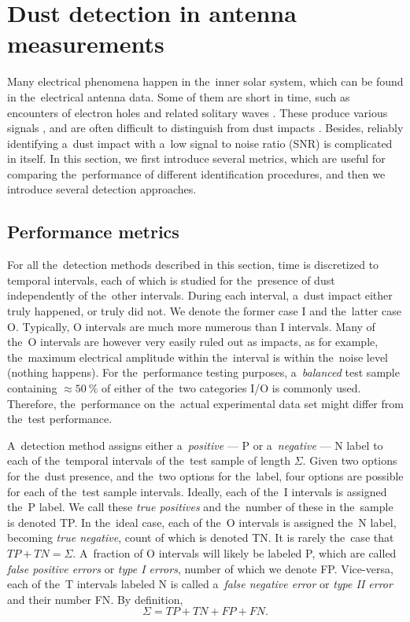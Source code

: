 \section{Dust detection in antenna measurements}

Many electrical phenomena happen in the~inner solar system, which can be found in the~electrical antenna data. Some of them are short in time, such as encounters of electron holes and related solitary waves \citep{malaspina2013electrostatic,steinvall2019multispacecraft}. These produce various signals \citep{pickett2004solitary}, and are often difficult to distinguish from dust impacts \citep{malaspina2016database,vaverka2018comparison}. Besides, reliably identifying a~dust impact with a~low signal to noise ratio ({SNR}) is complicated in itself. In this section, we first introduce several metrics, which are useful for comparing the~performance of different identification procedures, and then we introduce several detection approaches.

\subsection{Performance metrics}

For all the~detection methods described in this section, time is discretized to temporal intervals, each of which is studied for the~presence of dust independently of the~other intervals. During each interval, a~dust impact either truly happened, or truly did not. We denote the former case {I} and the~latter case {O}. Typically, O intervals are much more numerous than I intervals. Many of the~O intervals are however very easily ruled out as impacts, as for example, the~maximum electrical amplitude within the~interval is within the~noise level (nothing happens). For the~performance testing purposes, a~\textit{balanced} test sample containing $\approx \SI{50}{\%}$ of either of the~two categories I/O is commonly used. Therefore, the~performance on the~actual experimental data set might differ from the~test performance.

A~detection method assigns either a~\textit{positive} --- P or a~\textit{negative} --- N label to each of the~temporal intervals of the~test sample of length $\Sigma$. Given two options for the~dust presence, and the~two options for the~label, four options are possible for each of the~test sample intervals. Ideally, each of the~I intervals is assigned the~P label. We call these \textit{true positives} and the~number of these in the~sample is denoted {TP}. In the~ideal case, each of the~O intervals is assigned the~N label, becoming \textit{true negative}, count of which is denoted {TN}. It is rarely the~case that $TP + TN = \Sigma$. A~fraction of O intervals will likely be labeled P, which are called \textit{false positive errors} or \textit{type I errors}, number of which we denote {FP}. Vice-versa, each of the~T intervals labeled N is called a~\textit{false negative error} or \textit{type II error} and their number {FN}. By definition,
\begin{equation}
    \Sigma = TP + TN + FP + FN.
\end{equation}

